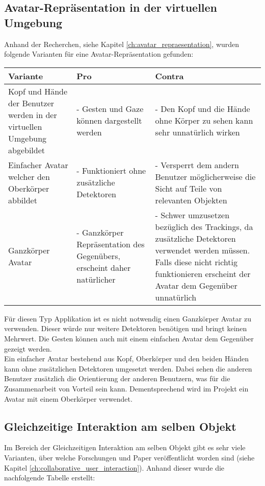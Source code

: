 \subsection{Avatar-Repräsentation in der virtuellen Umgebung}
Anhand der Recherchen, siehe Kapitel \ref{ch:avatar_repraesentation}, wurden folgende Varianten für eine Avatar-Repräsentation gefunden:
\begin{center}
	\begin{tabularx} {\textwidth} { |X|X|X| }
		\hline
		\rowcolor{black}
		\color{white} \textbf{Variante} & \color{white} \textbf{Pro} & 
		\color{white} \textbf{Contra} \\
		\hline
		Kopf und Hände der Benutzer werden in der virtuellen Umgebung abgebildet & - Gesten und Gaze können dargestellt werden & - Den Kopf und die Hände ohne Körper zu sehen kann sehr unnatürlich wirken \\
		\hline
		Einfacher Avatar welcher den Oberkörper abbildet & - Funktioniert ohne zusätzliche Detektoren & - Versperrt dem andern Benutzer möglicherweise die Sicht auf Teile von relevanten Objekten \\
		\hline
		Ganzkörper Avatar & - Ganzkörper Repräsentation des Gegenübers, erscheint daher natürlicher & - Schwer umzusetzen bezüglich des Trackings, da zusätzliche Detektoren verwendet werden müssen. Falls diese nicht richtig funktionieren erscheint der Avatar dem Gegenüber unnatürlich \\
		\hline	
	\end{tabularx}
\end{center}
\label{tbl:varianten_avatar}

\bigskip
Für diesen Typ Applikation ist es nicht notwendig einen Ganzkörper Avatar zu verwenden. Dieser würde nur weitere Detektoren benötigen und bringt keinen Mehrwert. Die Gesten können auch mit einem einfachen Avatar dem Gegenüber gezeigt werden. \\
\noindent Ein einfacher Avatar bestehend aus Kopf, Oberkörper und den beiden Händen kann ohne zusätzlichen Detektoren umgesetzt werden. Dabei sehen die anderen Benutzer zusätzlich die Orientierung der anderen Benutzern, was für die Zusammenarbeit von Vorteil sein kann. Dementsprechend wird im Projekt ein Avatar mit einem Oberkörper verwendet.

\subsection{Gleichzeitige Interaktion am selben Objekt}
Im Bereich der Gleichzeitigen Interaktion am selben Objekt gibt es sehr viele Varianten, über welche Forschungen und Paper veröffentlicht worden sind (siehe Kapitel \ref{ch:collaborative_user_interaction}). Anhand dieser wurde die nachfolgende Tabelle erstellt:


